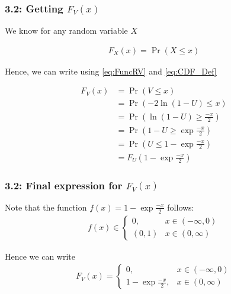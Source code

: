 \documentclass{beamer}
\begin{document}
\begin{frame}
	\frametitle{3.2: Getting $F_V(x)$}

	We know for any random variable $X$

	\begin{align}
		F_X(x) = \Pr(X \leq x)
		\label{eq:CDF_Def}
	\end{align}

	Hence, we can write using \eqref{eq:FuncRV} and \eqref{eq:CDF_Def}

	\begin{align}
		F_V(x) &= \Pr(V \leq x) \\
		&= \Pr(-2\ln{(1 - U)} \leq x)\\
		&= \Pr(\ln{(1 - U)} \geq \frac{-x}{2})\\
		&= \Pr(1 - U \geq \exp{\frac{-x}{2}})\\
		&= \Pr(U \leq 1 - \exp{\frac{-x}{2}})\\
		&= F_U(1 - \exp{\frac{-x}{2}})
		\label{eq: CDF_Rel}
	\end{align}

\end{frame}

\begin{frame}
	\frametitle{3.2: Final expression for $F_V(x)$}
	Note that the function $f(x) = 1 - \exp{\frac{-x}{2}}$ follows:
	\begin{align}
		f(x) \in
		\begin{cases}
			{0}, & x \in (-\infty, 0) \\
			(0, 1) & x \in (0, \infty)
		\end{cases}
	\end{align}

	Hence we can write
	\begin{align}
		F_V(x) = 
		\begin{cases}
			0, & x \in (-\infty, 0) \\
			1 - \exp{\frac{-x}{2}}, & x \in (0, \infty)
    		\end{cases}
	\end{align}
\end{frame}
\end{document}
